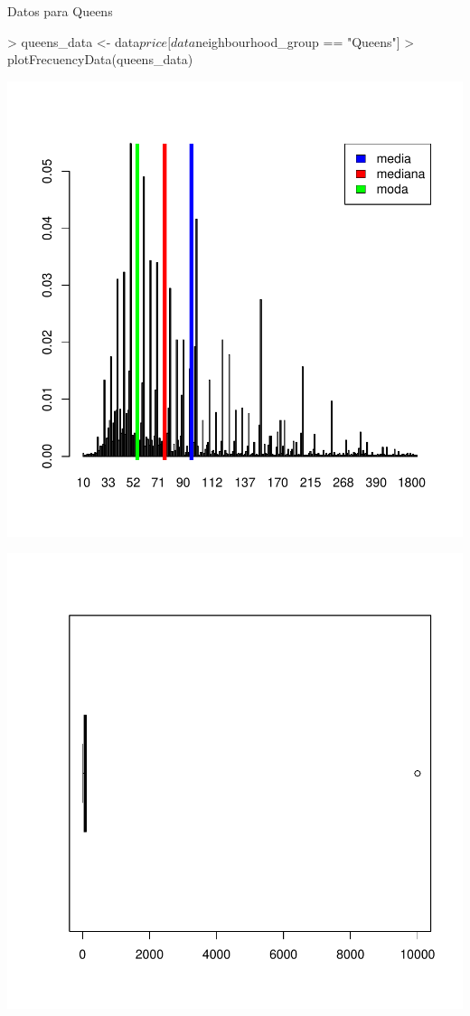 \documentclass [a4paper] {article}
\begin{document}
\begin{center}
Datos para Queens
\begin{center}
\begin{Schunk}
\begin{Sinput}
> queens_data <- data$price[data$neighbourhood_group == "Queens"]
> plotFrecuencyData(queens_data)
\end{Sinput}
\end{Schunk}
\includegraphics{entrega-035}
\end{center}
\begin{center}
\includegraphics{entrega-036}
\end{center}


\end{center}
\end{document}
